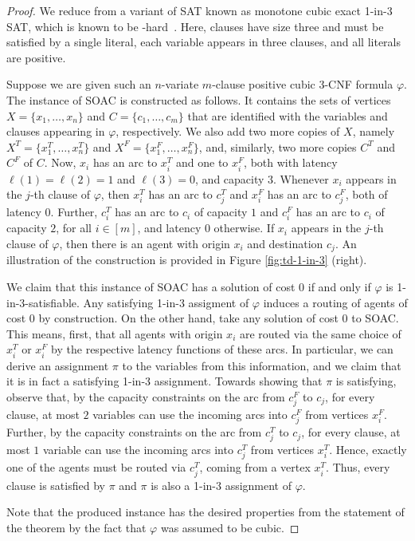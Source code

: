 \documentclass[letterpaper]{article} %
\newcommand{\problem}{{\sc SOAC}\xspace} %
\begin{document}
\begin{proof}
We reduce from a variant of SAT known as monotone cubic exact 1-in-3 SAT, which is known to be \NP-hard~\cite{PorschenSSW14,Schmidt2010d}.
Here, clauses have size three and must be satisfied by a single literal, each variable appears in three clauses, and all literals are positive.

Suppose we are given such an $n$-variate $m$-clause positive cubic $3$-CNF formula $\varphi$.
The instance of \problem is constructed as follows.
It contains the sets of vertices $X = \{x_1,\ldots,x_n\}$ and $C = \{c_1,\ldots,c_m\}$ that are identified with the variables and clauses appearing in $\varphi$, respectively.
We also add two more copies of $X$, namely $X^T = \{x^T_1,\ldots,x^T_n\}$ and $X^F = \{x^F_1,\ldots,x^F_n\}$, and, similarly, two more copies $C^T$ and $C^F$ of $C$.
Now, $x_i$ has an arc to $x^T_i$ and one to $x^F_i$, both with latency $\ell(1) = \ell(2) = 1$ and $\ell(3) = 0$, and capacity $3$.
Whenever $x_i$ appears in the $j$-th clause of $\varphi$, then $x^T_i$ has an arc to $c^T_j$ and $x^F_i$ has an arc to $c^F_j$, both of latency $0$.
Further, $c^T_i$ has an arc to $c_i$ of capacity $1$ and $c^F_i$ has an arc to $c_i$ of capacity $2$, for all $i \in [m]$, and latency $0$ otherwise.
If $x_i$ appears in the $j$-th clause of $\varphi$, then there is an agent with origin $x_i$ and destination $c_j$. An illustration of the construction is provided in Figure \ref{fig:td-1-in-3} (right).

We claim that this instance of \problem{} has a solution of cost $0$ if and only if $\varphi$ is 1-in-3-satisfiable.
Any satisfying 1-in-3 assigment of $\varphi$ induces a routing of agents of cost $0$ by construction.
On the other hand, take any solution of cost $0$ to \problem.
This means, first, that all agents with origin $x_i$ are routed via the same choice of $x_i^T$ or $x_i^F$ by the respective latency functions of these arcs. In particular, we can derive an assignment $\pi$ to the variables from this information, and we claim that it is in fact a satisfying 1-in-3 assignment.
Towards showing that $\pi$ is satisfying, observe that, by the capacity constraints on the arc from $c^F_j$ to $c_j$, for every clause, at most $2$ variables can use the incoming arcs into $c^F_j$ from vertices $x^F_i$. Further, by the capacity constraints on the arc from $c^T_j$ to $c_j$, for every clause, at most $1$ variable can use the incoming arcs into $c^T_j$ from vertices $x^T_i$. Hence, exactly one of the agents must be routed via $c^T_j$, coming from a vertex $x^T_i$. Thus, every clause is satisfied by $\pi$ and $\pi$ is also a 1-in-3 assignment of $\varphi$.

Note that the produced instance has the desired properties from the statement of the theorem by the fact that $\varphi$ was assumed to be cubic.
\end{proof}
\end{document}
